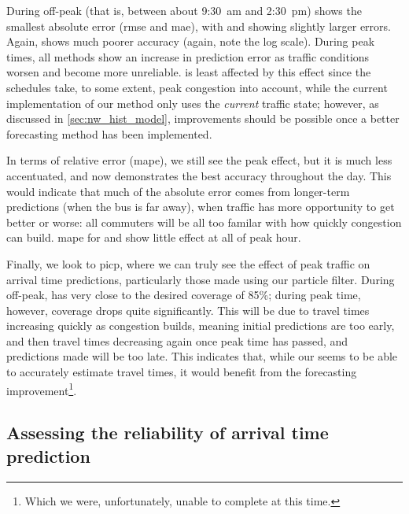 During off-peak (that is, between about 9:30~am and 2:30~pm) \Fpf{} shows the smallest absolute error (\gls{rmse} and \gls{mae}), with \Fhist{} and \Fsched{} showing slightly larger errors. Again, \Fnorm{} shows much poorer accuracy (again, note the log scale). During peak times, all methods show an increase in prediction error as traffic conditions worsen and become more unreliable. \Fsched{} is least affected by this effect since the schedules take, to some extent, peak congestion into account, while the current implementation of our method only uses the \emph{current} traffic state; however, as discussed in \cref{sec:nw_hist_model}, improvements should be possible once a better forecasting method has been implemented.

In terms of relative error (\gls{mape}), we still see the peak effect, but it is much less accentuated, and now \Fpf{} demonstrates the best accuracy throughout the day. This would indicate that much of the absolute error comes from longer-term predictions (when the bus is far away), when traffic has more opportunity to get better or worse: all commuters will be all too familar with how quickly congestion can build. \gls{mape} for \Fsced{} and \Fhist{} show little effect at all of peak hour.


Finally, we look to \gls{picp}, where we can truly see the effect of peak traffic on arrival time predictions, particularly those made using our particle filter. During off-peak, \Fpf{} has very close to the desired coverage of 85\%; during peak time, however, coverage drops quite significantly. This will be due to travel times increasing quickly as congestion builds, meaning initial predictions are too early, and then travel times decreasing again once peak time has passed, and predictions made will be too late. This indicates that, while our \pf{} seems to be able to accurately estimate travel times, it would benefit from the forecasting improvement\footnote{Which we were, unfortunately, unable to complete at this time.}.




\subsection{Assessing the reliability of arrival time prediction}
\label{sec:prediction_model_comp_probs}

